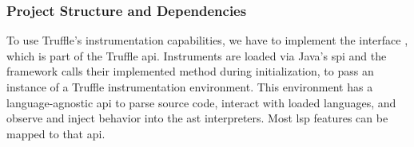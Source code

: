     \subsubsection{Project Structure and Dependencies}
    \label{sec:impl:projectStructure}
        To use Truffle's instrumentation capabilities, we have to implement the interface , which is part of the Truffle \ac{api}. Instruments are loaded via Java's \ac{spi} and the framework calls their implemented  method during initialization, to pass an instance of a Truffle instrumentation environment. This environment has a language-agnostic \ac{api} to parse source code, interact with loaded languages, and observe and inject behavior into the \ac{ast} interpreters. Most \ac{lsp} features can be mapped to that \ac{api}.
        

